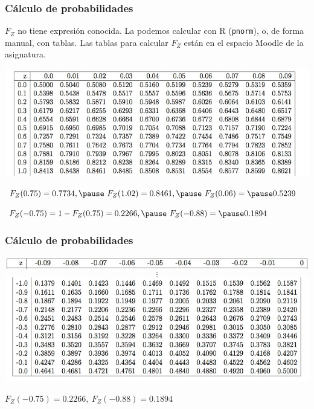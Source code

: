 \documentclass[handout]{beamer}\usepackage[]{graphicx}\usepackage[]{color}
\theoremstyle{plain}
\theoremstyle{definition}
\begin{document}
\begin{frame}
\frametitle{Cálculo de probabilidades}
\vspace*{-2ex}

$F_Z$ no tiene expresión conocida. La podemos calcular con  R (\texttt{pnorm}), o, de forma manual, con tablas.
Las tablas para calcular $F_Z$ están en  el espacio Moodle de la asignatura.
\vspace*{-2ex}

\begin{center}
\hspace*{-0.4cm}\includegraphics[width=1.1\linewidth]{tabla.jpg}
\end{center}
\pause

{\small $F_Z(0.75)=0.7734,\pause\ F_Z(1.02)=0.8461,\pause\ F_Z(0.06)=\pause 0.5239$\\[1ex]
\pause

$F_Z(-0.75)=1-F_Z(0.75)=0.2266,\pause\ F_Z(-0.88)=\pause 0.1894$

}
\end{frame}


\begin{frame}
\frametitle{Cálculo de probabilidades}
\vspace*{-1cm}

\begin{center}
\hspace*{-0.2cm}\includegraphics[width=1.06\linewidth]{taula4.jpg}
$$
\vdots
$$
\hspace*{-0.4cm}\includegraphics[width=1.1\linewidth]{tabla2.jpg}
\end{center}

{\small 
$F_Z(-0.75)= 0.2266,\ F_Z(-0.88)= 0.1894$

}
\end{frame}
\end{document}

